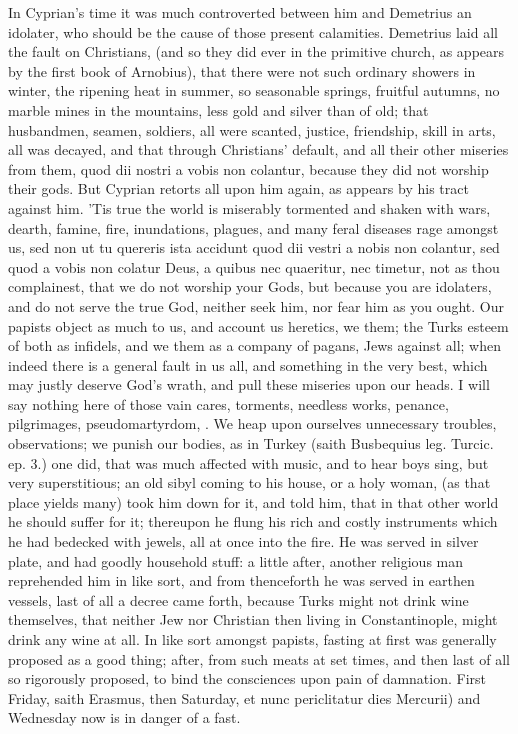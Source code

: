 {In Cyprian's time it was much controverted between him and Demetrius an
idolater, who should be the cause of those present calamities.
Demetrius laid all the fault on Christians, (and so they did ever in
the primitive church, as appears by the first book of Arnobius),
that there were not such ordinary showers in winter, the ripening
heat in summer, so seasonable springs, fruitful autumns, no marble
mines in the mountains, less gold and silver than of old; that
husbandmen, seamen, soldiers, all were scanted, justice, friendship,
skill in arts, all was decayed, and that through Christians' default,
and all their other miseries from them, quod dii nostri a vobis non
colantur, because they did not worship their gods. But Cyprian retorts
all upon him again, as appears by his tract against him. 'Tis true the
world is miserably tormented and shaken with wars, dearth, famine,
fire, inundations, plagues, and many feral diseases rage amongst us,
sed non ut tu quereris ista accidunt quod dii vestri a nobis non
colantur, sed quod a vobis non colatur Deus, a quibus nec quaeritur,
nec timetur, not as thou complainest, that we do not worship your Gods,
but because you are idolaters, and do not serve the true God, neither
seek him, nor fear him as you ought. Our papists object as much to us,
and account us heretics, we them; the Turks esteem of both as infidels,
and we them as a company of pagans, Jews against all; when indeed there
is a general fault in us all, and something in the very best, which may
justly deserve God's wrath, and pull these miseries upon our heads. I
will say nothing here of those vain cares, torments, needless works,
penance, pilgrimages, pseudomartyrdom, \etc{}. We heap upon ourselves
unnecessary troubles, observations; we punish our bodies, as in Turkey
(saith Busbequius leg. Turcic. ep. 3.) one did, that was much
affected with music, and to hear boys sing, but very superstitious; an
old sibyl coming to his house, or a holy woman, (as that place yields
many) took him down for it, and told him, that in that other world he
should suffer for it; thereupon he flung his rich and costly
instruments which he had bedecked with jewels, all at once into the
fire. He was served in silver plate, and had goodly household stuff: a
little after, another religious man reprehended him in like sort, and
from thenceforth he was served in earthen vessels, last of all a decree
came forth, because Turks might not drink wine themselves, that neither
Jew nor Christian then living in Constantinople, might drink any wine
at all. In like sort amongst papists, fasting at first was generally
proposed as a good thing; after, from such meats at set times, and then
last of all so rigorously proposed, to bind the consciences upon pain
of damnation. First Friday, saith Erasmus, then Saturday, et nunc
periclitatur dies Mercurii) and Wednesday now is in danger of a fast.

}
